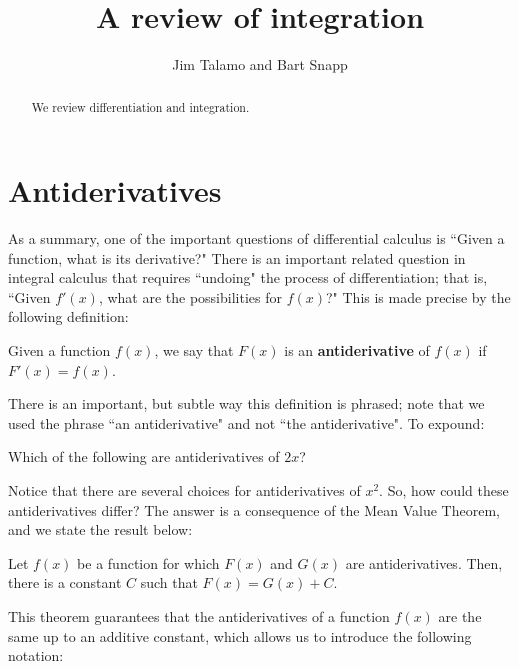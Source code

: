 \documentclass[nooutcomes]{ximera}
\author{Jim Talamo and Bart Snapp}
\title[Dig-In:]{A review of integration}
\begin{document}
\begin{abstract}
  We review differentiation and integration.
\end{abstract}
\maketitle

\section{Antiderivatives}

As a summary, one of the important questions of differential calculus is ``Given a function, what is its derivative?"  There is an important related question in integral calculus that requires ``undoing" the process of differentiation; that is, ``Given $f'(x)$, what are the possibilities for $f(x)$?"   This is made precise by the following definition:

\begin{definition}  
Given a function $f(x)$, we say that $F(x)$ is an \textbf{antiderivative} of $f(x)$ if $F'(x) = f(x)$.
\end{definition}

 There is an important, but subtle way this definition is phrased; note that we used the phrase ``an antiderivative" and not ``the antiderivative".  To expound:
 
 \begin{question}
  Which of the following are antiderivatives of $2x$?
  \begin{selectAll}
  \end{selectAll}
\end{question}

Notice that there are several choices for antiderivatives of $x^2$.  So, how could these antiderivatives differ?  The answer is a consequence of the Mean Value Theorem, and we state the result below:

\begin{theorem}
Let $f(x)$ be a function for which $F(x)$ and $G(x)$ are antiderivatives.  Then, there is a constant $C$ such that $F(x) = G(x) +C$. 
\end{theorem}

This theorem guarantees that the antiderivatives of a function $f(x)$ are the same up to an additive constant, which allows us to introduce the following notation:
\end{document}
